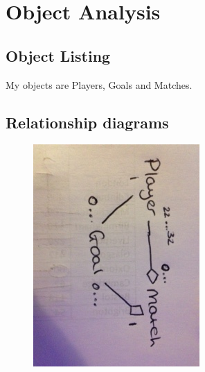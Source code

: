 \section{Object Analysis}

\subsection{Object Listing}
 My objects are Players, Goals and Matches. 
\subsection{Relationship diagrams}
\begin{figure}[H]
	\includegraphics{classdiagram}
\end{figure}

